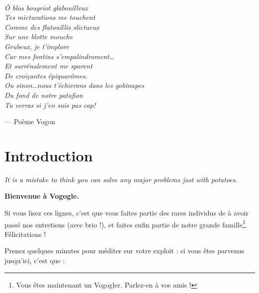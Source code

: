 \newpage ~

\vspace{5cm}

\noindent\emph{Ô blas bougriot glabouilleux\\
Tes micturations me touchent\\
Comme des flatouillis slictueux\\
Sur une blotte mouche\\
Grubeux, je t'implore\\
Car mes fontins s'empalindroment\ldots\\
Et surrénalement me sporent\\
De croiçantes épiquarômes.\\
Ou sinon\ldots nous t'échierons dans les gobinapes\\
Du fond de notre patafion\\
Tu verras si j'en suis pas cap!
}

\vspace{1cm}

\hspace{5cm} --- Poème Vogon

\newpage

\section{Introduction}

\emph{It is a mistake to think you can solve any major problems just with
potatoes.}


\vspace{1cm}

\textbf{Bienvenue à Vogogle.}

Si vous lisez ces lignes, c'est que vous faites partie des rares individus de à
avoir passé nos entretiens (avec brio !), et faites enfin partie de notre
grande famille\footnote{Vous êtes maintenant un Vogogler. Parlez-en à vos
amis !}. Félicitations !

Prenez quelques minutes pour méditer sur votre exploit : si vous êtes parvenus
jusqu'ici, c'est que :

